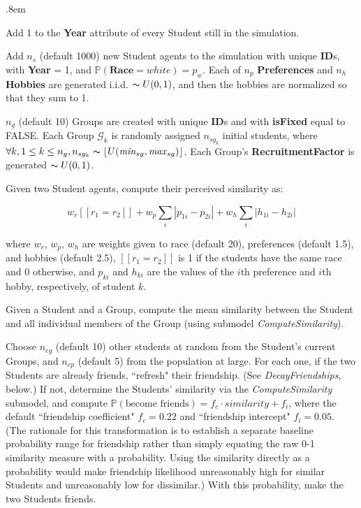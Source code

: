\begin{description}
\itemsep.8em
\item[\textsl{IncrementYears}] Add 1 to the \textbf{Year} attribute of every Student
still in the simulation.

\item[\textsl{AddNewStudents}] Add $n_s$ (default 1000) new Student agents to
the simulation with unique \textbf{ID}s, with \textbf{Year} = 1, and
$\mathbb{P}(\textbf{Race}=white) = p_w$. Each of $n_p$ \textbf{Preferences}
and $n_h$ \textbf{Hobbies} are generated i.i.d. $\thicksim U(0,1)$, and then
the hobbies are normalized so that they sum to 1.

\item[\textsl{AddNewGroups}] $n_g$ (default 10) Groups are created with unique
\textbf{ID}s and with \textbf{isFixed} equal to FALSE. Each Group
$\mathcal{G}_k$ is randomly assigned $n_{sg_k}$ initial students, where
$\forall k, 1\leq k\leq n_g, n_{sg_k} \thicksim \left\lfloor
U(\text{\textit{min}}_{sg},\text{\textit{max}}_{sg}) \right\rfloor$. Each
Group's \textbf{RecruitmentFactor} is generated $\thicksim U(0,1)$.

\item[\textsl{ComputeSimilarity}] Given two Student agents, compute their perceived
similarity as:

\[
w_r [\![r_1=r_2]\!] +
w_p \sum_i |p_{1i}-p_{2i}| + 
w_h \sum_i |h_{1i}-h_{2i}|
\]

where $w_r$, $w_p$, $w_h$ are weights given to race (default 20), preferences
(default 1.5), and hobbies (default 2.5), $[\![r_1=r_2]\!]$ is 1 if the students have the same
race and 0 otherwise, and $p_{ki}$ and $h_{ki}$ are the values of the $i$th
preference and $i$th hobby, respectively, of student $k$.

\item[\textsl{ComputeAffinity}] Given a Student and a Group, compute the mean
similarity between the Student and all individual members of the Group (using
submodel \textsl{ComputeSimilarity}).

\item[\textsl{EncounterOthers}] Choose $n_{eg}$ (default 10) other students at random
from the Student's current Groups, and $n_{ep}$ (default 5) from the population at
large. For each one, if the two Students are already friends, ``refresh" their
friendship. (See \textsl{DecayFriendships}, below.) If not, determine the
Students' similarity via the \textsl{ComputeSimilarity} submodel, and compute
$\mathbb{P}(\text{become friends})=f_c \cdot \textit{similarity} + f_i$, where
the default ``friendship coefficient" $f_c=0.22$ and ``friendship intercept"
$f_i=0.05$. (The rationale for this transformation is to establish a separate
baseline probability range for friendship rather than simply equating the raw
0-1 similarity measure with a probability. Using the similarity directly as a
probability would make friendship likelihood unreasonably high for similar
Students and unreasonably low for dissimilar.) With this probability, make the
two Students friends.


\end{description}
